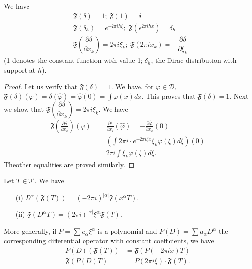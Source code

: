 \begin{proposition}\label{chap4-prop9}
We have
\begin{align*}
&\mathfrak{F}(\delta)=1; \ \mathfrak{F}(1)=\delta\\[4pt]
& \mathfrak{F}(\delta_{h})=e^{-2\pi ih\xi}; \ \mathfrak{F}(e^{2\pi
    ihx})=\delta_{h}\\[4pt]
& \mathfrak{F}\left(\dfrac{\partial \delta}{\partial
    x_{k}}\right)=2\pi i\xi_{k}; \ \mathfrak{F}(2\pi
  ix_{k})=-\dfrac{\partial \delta}{\partial \xi_{k}}
\end{align*}
(1 denotes the constant function with value 1; $\delta_{h}$, the Dirac
distribution with support at $h$).
\end{proposition}

\begin{proof}
Let us verify that $\mathfrak{F}(\delta)=1$. We have, for $\varphi\in
\mathcal{D}$,
$\mathfrak{F}(\delta)(\varphi)=\delta(\widehat{\varphi})=\widehat{\varphi}(0)=\int
\varphi(x)dx$. This proves that $\mathfrak{F}(\delta)=1$. Next we show
that $\mathfrak{F}\left(\dfrac{\partial \delta}{\partial
  x_{k}}\right)=2\pi i\xi_{k}$. We have
\begin{align*}
\mathfrak{F}\left(\frac{\partial \delta}{\partial
  x_{k}}\right)(\varphi)&= \frac{\partial \delta}{\partial
  x_{k}}(\widehat{\varphi})=-\frac{\partial
  \widehat{\varphi}}{\partial x_{k}}(0)\\[4pt]
&= \left(\int 2\pi i\cdot e^{-2\pi i\xi
  x}\xi_{k}\varphi(\xi)d\xi\right)(0)\\[3pt]
&= 2\pi i\int \xi_{k}\varphi(\xi)d\xi.
\end{align*}
The\pageoriginale other equalities are proved similarly.
\end{proof}

\begin{proposition}\label{chap4-prop10}
Let $T\in \mathfrak{I}'$. We have
\begin{itemize}
\item[\rm(i)] $D^{\alpha}(\mathfrak{F}(T))=(-2\pi
  i)^{|\alpha|}\mathfrak{F}(x^{\alpha}T)$.

\item[\rm(ii)] $\mathfrak{F}(D^{\alpha}T)=(2\pi i)^{|\alpha|}\xi^{\alpha}\mathfrak{F}(T)$.
\end{itemize}
More generally, if $P=\sum a_{\alpha}\xi^{\alpha}$ is a polynomial and
$P(D)=\sum a_{\alpha}D^{\alpha}$ the corresponding differential
operator with constant coefficients, we have
\begin{align*}
P(D)(\mathfrak{F}(T)) &=\mathfrak{F}(P(-2\pi ix)T)\\[3pt]
\mathfrak{F}(P(D)T) &= P(2\pi i\xi)\cdot \mathfrak{F}(T).
\end{align*}
\end{proposition}
